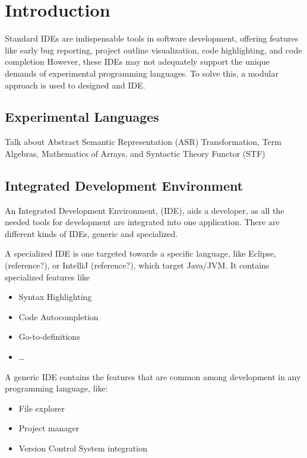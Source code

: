 \chapter{Introduction}

Standard IDEs are indispensable tools in software development, offering features
like early bug reporting, project outline visualization, code highlighting, and
code completion However, these IDEs may not adequately support the unique
demands of experimental programming languages.
To solve this, a modular approach is used to designed and IDE.

\section{Experimental Languages}

Talk about Abstract Semantic Representation (ASR) Transformation,
Term Algebras, Mathematics of Arrays, and Syntactic Theory Functor (STF)

\section{Integrated Development Environment}

An Integrated Development Environment, (IDE), aids a developer, as all the
needed tools for development are integrated into one application. There are
different kinds of IDEs, generic and specialized.

A specialized IDE is one targeted towards a specific language, like Eclipse,
(reference?), or IntelliJ (reference?), which target Java/JVM. It contains
specialized features like

\begin{itemize}
  \item Syntax Highlighting
  \item Code Autocompletion
  \item Go-to-definitions
  \item \dots
\end{itemize}


A generic IDE contains the features that are common among development in any
programming language, like:

\begin{itemize}
  \item File explorer
  \item Project manager
  \item Version Control System integration
\end{itemize}
